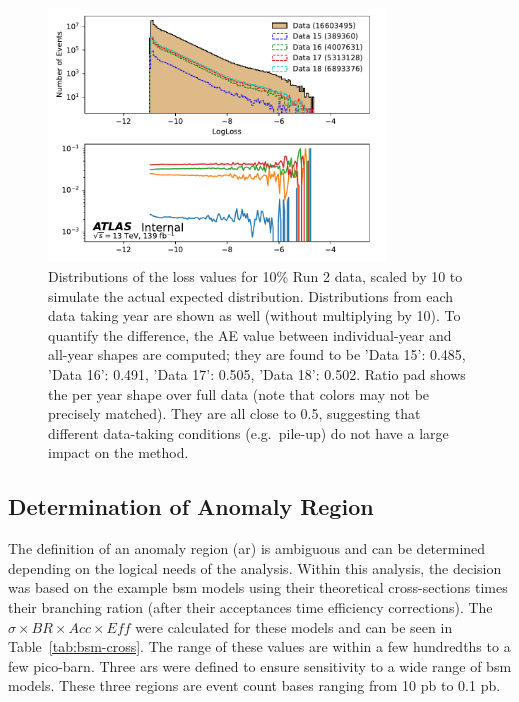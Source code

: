 \begin{figure}[H]
    \begin{center}
        \includegraphics[width=0.8\textwidth]{figs/ch6/logloss_log}
    \end{center}
    \caption{
        Distributions of the loss values for 10\% Run 2 data, scaled by 10 to simulate the actual expected distribution.
        Distributions from each data taking year are shown as well (without multiplying by 10).
        To quantify the difference, the  AE value between individual-year and all-year shapes are computed; they are found to be 'Data 15': 0.485, 'Data 16': 0.491, 'Data 17': 0.505, 'Data 18': 0.502.
        Ratio pad shows the per year shape over full data (note that colors may not be precisely matched).
        They are all close to 0.5, suggesting that different data-taking conditions (e.g.\ pile-up) do not have a large impact on the method.
    }
\label{fig:loss_year}
\end{figure}

\subsection{Determination of Anomaly Region}

The definition of an anomaly region (\gls{ar}) is ambiguous and can be determined depending on the logical needs of the analysis. Within this analysis, the decision was based 
on the example \gls{bsm} models using their theoretical cross-sections times their branching ration (after their acceptances time efficiency corrections). 
The $\sigma \times BR \times Acc  \times  Eff$ were calculated for these models and can be seen in Table~\ref{tab:bsm-cross}. The range 
of these values are within a few hundredths to a few pico-barn. Three \gls{ar}s were defined to ensure sensitivity to a wide range of \gls{bsm} models. These three regions are 
event count bases ranging from 10 pb to 0.1 pb. 

